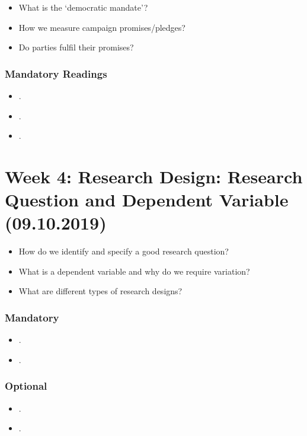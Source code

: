 \documentclass[abstract=on,parskip=full,headings=standardclasses,fontsize=11pt,paper=a4]{scrartcl}
\begin{document}
\begin{itemize}
\renewcommand\labelitemi{--}
\item What is the `democratic mandate'? 
\item How we measure campaign promises/pledges?
\item Do parties fulfil their promises?
\end{itemize}

\subsubsection*{Mandatory Readings}
\begin{itemize}
\item {}.
\item {}.
\item {}.
\end{itemize}




\section{Week 4:  Research Design: Research Question and Dependent Variable  (09.10.2019)}

\begin{itemize}
\renewcommand\labelitemi{--}
\item How do we identify and specify a good research question?
\item What is a dependent variable and why do we require variation?
\item What are different types of research designs?
\end{itemize}


\subsubsection*{Mandatory}


\begin{itemize}
\item {}.
\item {}.
\end{itemize}


\subsubsection*{Optional}
\begin{itemize}
\item {}.
\item {}.
\end{itemize}
\end{document}
